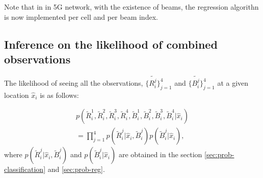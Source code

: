 \documentclass[conference, 10pt]{IEEEtran}
\begin{document}
Note that in in 5G network, with the existence of beams, the regression algorithn is now implemented per cell and per beam index.

\subsection{Inference on the likelihood of combined observations}
\label{sec:prob-combined}
The likelihood of seeing all the observations, $\{\tilde{R^j_i}\}_{j=1}^4$ and $\{\tilde{B^j_i}\}_{j=1}^4$ at a given location $\hat{x}_{i}$ is as follows:

\begin{equation} 
\begin{split}
	p(\tilde{R}^1_i, \tilde{R}^2_i, \tilde{R}^3_i,\tilde{R}^4_i, \tilde{B}^1_i, \tilde{B}^2_i, \tilde{B}^3_i, \tilde{B}^4_i|\hat{x}_{i})
	\\
	=\prod_{j=1}^4 p(\tilde{R}^j_i|\hat{x}_{i}, \tilde{B}^j_i)p(\tilde{B}^j_i|\hat{x}_{i}),
\end{split}
\label{eqn:combined}
\end{equation}
where $p(\tilde{R}^j_i|\hat{x}_{i}, \tilde{B}^j_i)$ and $p(\tilde{B}^j_i|\hat{x}_{i})$ are obtained in the section \ref{sec:prob-classification} and \ref{sec:prob-reg}.


\end{document}

